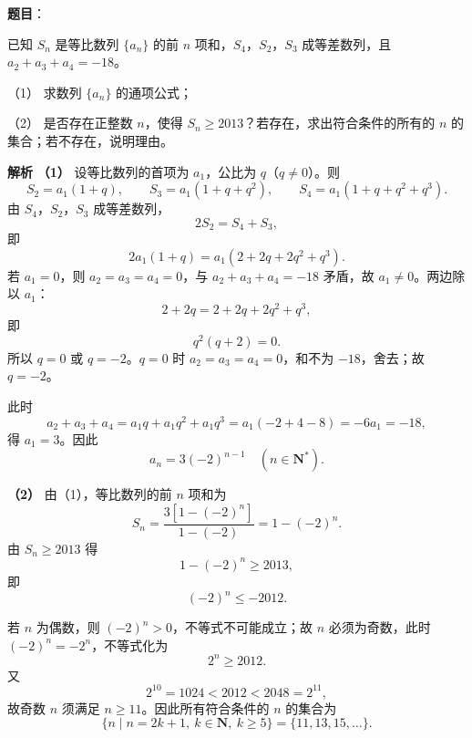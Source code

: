 \begin{answer}

\textbf{题目}：

已知 $S_n$ 是等比数列 $\{a_n\}$ 的前 $n$ 项和，$S_4$，$S_2$，$S_3$ 成等差数列，且 $a_2+a_3+a_4=-18$。

（1） 求数列 $\{a_n\}$ 的通项公式；

（2） 是否存在正整数 $n$，使得 $S_n\geqslant2013$？若存在，求出符合条件的所有的 $n$ 的集合；若不存在，说明理由。

\textbf{解析}
\textbf{（1）} 设等比数列的首项为 $a_1$，公比为 $q$（$q\neq0$）。则
\nopagebreak[4]
\[S_2=a_1(1+q),\qquad S_3=a_1(1+q+q^2),\qquad S_4=a_1(1+q+q^2+q^3).\]
由 $S_4$，$S_2$，$S_3$ 成等差数列，
\nopagebreak[4]
\[2S_2=S_4+S_3,\]
即
\nopagebreak[4]
\[2a_1(1+q)=a_1(2+2q+2q^2+q^3).\]
若 $a_1=0$，则 $a_2=a_3=a_4=0$，与 $a_2+a_3+a_4=-18$ 矛盾，故 $a_1\neq0$。两边除以 $a_1$：
\nopagebreak[4]
\[2+2q=2+2q+2q^2+q^3,\]
即
\nopagebreak[4]
\[q^2(q+2)=0.\]
所以 $q=0$ 或 $q=-2$。$q=0$ 时 $a_2=a_3=a_4=0$，和不为 $-18$，舍去；故 $q=-2$。

此时
\nopagebreak[4]
\[a_2+a_3+a_4=a_1q+a_1q^2+a_1q^3
=a_1\left(-2+4-8\right)=-6a_1=-18,\]
得 $a_1=3$。因此
\nopagebreak[4]
\[a_n=3(-2)^{n-1}\quad(n\in\mathbf N^*).\]

\textbf{（2）} 由（1），等比数列的前 $n$ 项和为
\nopagebreak[4]
\[S_n=\frac{3\left[1-(-2)^n\right]}{1-(-2)}=1-(-2)^n.\]
由 $S_n\geqslant2013$ 得
\nopagebreak[4]
\[1-(-2)^n\geqslant2013,\]
即
\nopagebreak[4]
\[(-2)^n\leqslant-2012.\]

若 $n$ 为偶数，则 $(-2)^n>0$，不等式不可能成立；故 $n$ 必须为奇数，此时 $(-2)^n=-2^n$，不等式化为
\nopagebreak[4]
\[2^n\geqslant2012.\]
又
\nopagebreak[4]
\[2^{10}=1024<2012<2048=2^{11},\]
故奇数 $n$ 须满足 $n\geqslant11$。因此所有符合条件的 $n$ 的集合为
\nopagebreak[4]
\[\{n\mid n=2k+1,\ k\in\mathbf N,\ k\geqslant5\}=\{11,13,15,\ldots\}.\]



\end{answer}
